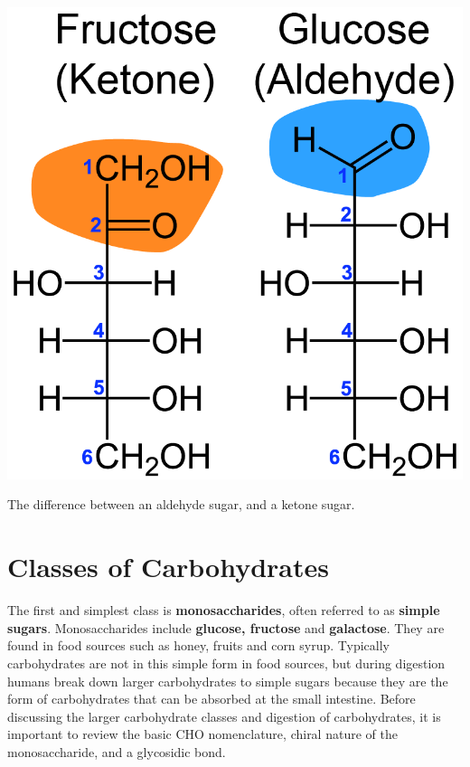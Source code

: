 \documentclass{tufte-handout}
\begin{document}
\begin{marginfigure}
\includegraphics{figures/sugar-aldehydes.png}
\caption{The difference between an aldehyde sugar, and a ketone sugar.}\label{fig:sugar-aldehydes}
\end{marginfigure}

\section{Classes of Carbohydrates}\label{classes-of-carbohydrates}


 The first and simplest class is \textbf{monosaccharides}, often referred to as \textbf{simple sugars}. Monosaccharides include \textbf{glucose, fructose} and \textbf{galactose}. They are found in food sources such as honey, fruits and corn syrup. Typically carbohydrates are not in this simple form in food sources, but during digestion humans break down larger carbohydrates to simple sugars because they are the form of carbohydrates that can be absorbed at the small intestine. Before discussing the larger carbohydrate classes and digestion of carbohydrates, it is important to review the basic CHO nomenclature, chiral nature of the monosaccharide, and a glycosidic bond.
\end{document}
